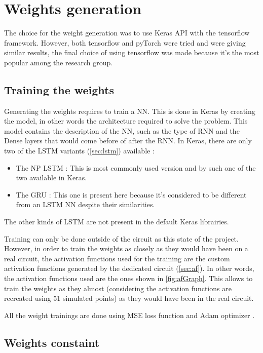\section{Weights generation}
\label{sec:genwei}

The choice for the weight generation was to use Keras API with the tensorflow framework. However, both tensorflow and pyTorch were tried and were giving similar results, the final choice of using tensorflow was made because it's the most popular among the research group.

\subsection{Training the weights}

Generating the weights requires to train a \ac{NN}. This is done in Keras by creating the model, in other words the architecture required to solve the problem. This model contains the description of the \ac{NN}, such as the type of \ac{RNN} and the Dense layers that would come before of after the \ac{RNN}. In Keras, there are only two of the \ac{LSTM} variants (\cref{sec:lstm}) available :

\begin{itemize}
  \item The \ac{NP} \ac{LSTM} : This is most commonly used version and by such one of the two available in Keras.
  \item The \ac{GRU} : This one is present here because it's considered to be different from an \ac{LSTM} \ac{NN} despite their similarities.
\end{itemize}

The other kinds of \ac{LSTM} are not present in the default Keras librairies.

Training can only be done outside of the circuit as this state of the project. However, in order to train the weights as closely as they would have been on a real circuit, the activation functions used for the training are the custom activation functions generated by the dedicated circuit (\cref{sec:af}). In other words, the activation functions used are the ones shown in \cref{fig:afGraph}. This allows to train the weights as they almost (considering the activation functions are recreated using 51 simulated points) as they would have been in the real circuit.

All the weight trainings are done using \ac{MSE} loss function and Adam optimizer \cite{adamOpti}.

\subsection{Weights constaint}

